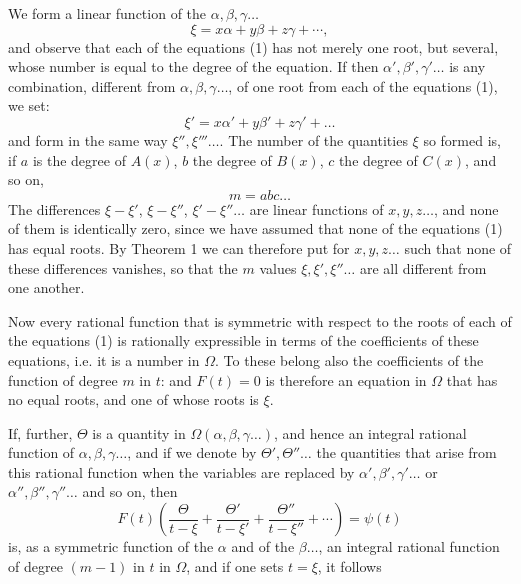 
We form a linear function of the $\alpha, \beta, \gamma \ldots$
\[
\xi = x\alpha + y\beta + z\gamma + \cdots,
\]
and observe that each of the equations (1) has not merely one root, but several, whose number is equal to the degree of the equation. If then $\alpha', \beta', \gamma' \ldots$ is any combination, different from $\alpha, \beta, \gamma \ldots$, of one root from each of the equations (1), we set:
\[
\xi' = x\alpha' + y\beta' + z\gamma' + \ldots
\]
and form in the same way $\xi'', \xi''' \ldots$. The number of the quantities $\xi$ so formed is, if $a$ is the degree of $A(x)$, $b$ the degree of $B(x)$, $c$ the degree of $C(x)$, and so on,
\[
m = abc \ldots
\]
The differences $\xi - \xi'$, $\xi - \xi''$, $\xi' - \xi'' \ldots$ are linear functions of $x, y, z \ldots$, and none of them is identically zero, since we have assumed that none of the equations (1) has equal roots. By Theorem 1 we can therefore put for $x, y, z \ldots$ such  that none of these differences vanishes, so that the $m$ values $\xi, \xi', \xi'' \ldots$ are all different from one another.

Now every rational function that is symmetric with respect to the roots of each of the equations (1) is rationally expressible in terms of the coefficients of these equations, i.e. it is a number in $\Omega$. To these belong also the coefficients of the function of degree $m$ in $t$:
and $F(t) = 0$ is therefore an equation in $\Omega$ that has no equal roots, and one of whose roots is $\xi$.

If, further, $\Theta$ is a quantity in $\Omega(\alpha, \beta, \gamma \ldots)$, and hence an integral rational function of $\alpha, \beta, \gamma \ldots$, and if we denote by $\Theta', \Theta'' \ldots$ the quantities that arise from this rational function when the variables are replaced by $\alpha', \beta', \gamma' \ldots$ or $\alpha'', \beta'', \gamma'' \ldots$ and so on, then
\[
F(t) \left( \frac{\Theta}{t - \xi} + \frac{\Theta'}{t - \xi'} + \frac{\Theta''}{t - \xi''} + \cdots \right) = \psi(t)
\]
is, as a symmetric function of the $\alpha$ and of the $\beta \ldots$, an integral rational function of degree $(m-1)$ in $t$ in $\Omega$, and if one sets $t = \xi$, it follows
